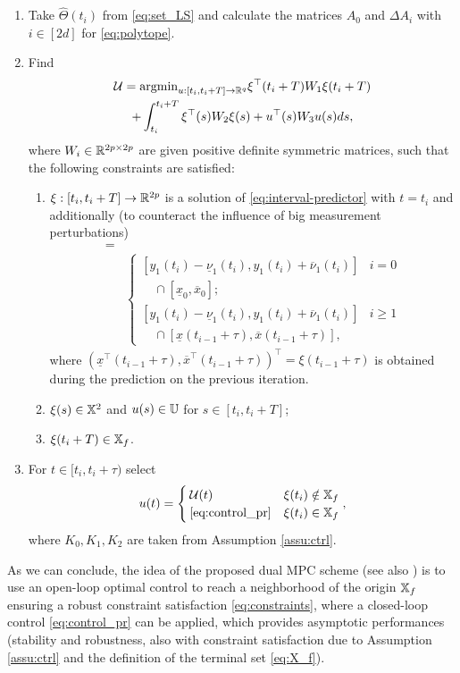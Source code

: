 \begin{enumerate}
	\item Take $\hat{\Theta}(t_{i})$ from \eqref{eq:set_LS} and calculate
	the matrices $A_{0}$ and $\Delta A_{i}$ with $i\in[2d]$ for \eqref{eq:polytope}.
	\item Find
	\begin{gather}
	\mathcal{U}=\text{argmin}_{u:[t_{i},t_{i}+T]\to\mathbb{R}^{q}}\xi^{\top}(t_{i}+T)W_{1}\xi(t_{i}+T)\label{eq:OCP}\\
	+\int_{t_{i}}^{t_{i}+T}\xi^{\top}(s)W_{2}\xi(s)+u^{\top}(s)W_{3}u(s)ds,\nonumber 
	\end{gather}
	where $W_{i}\in\mathbb{R}^{2p\times2p}$ are given positive definite symmetric
	matrices, such that the following constraints are satisfied: 
	\begin{enumerate}
		\item $\xi:[t_{i},t_{i}+T]\to\mathbb{R}^{2p}$ is a solution of \eqref{eq:interval-predictor}
		with $t=t_{i}$ and additionally (to counteract the influence of big
		measurement perturbations)
		\begin{align}
		[\underline{x}&(t_{i}),\overline{x}(t_{i})]=\label{eq:update}\\
		&\begin{cases}
		[y_{1}(t_{i})-\underline{\nu}_{1}(t_{i}),y_{1}(t_{i})+\overline{\nu}_{1}(t_{i})] & i=0\\
		\quad\cap[\underline{x}_{0},\overline{x}_{0}];\\{}
		[y_{1}(t_{i})-\underline{\nu}_{1}(t_{i}),y_{1}(t_{i})+\overline{\nu}_{1}(t_{i})] & i\geq1\\
		\quad\cap[\underline{x}(t_{i-1}+\tau),\overline{x}(t_{i-1}+\tau)],
		\end{cases}\nonumber
		\end{align}
		where $(\underline{x}^{\top}(t_{i-1}+\tau),\overline{x}^{\top}(t_{i-1}+\tau))^{\top}=\xi(t_{i-1}+\tau)$
		is obtained during the prediction on the previous iteration.
		\item $\xi(s)\in\mathbb{X}^{2}$ and $u(s)\in\mathbb{U}$ for $s\in[t_{i},t_{i}+T]$; 
		\item $\xi(t_{i}+T)\in\mathbb{X}_{f}$.
	\end{enumerate}
	\item For $t\in[t_{i},t_{i}+\tau)$ select
	\begin{equation}
	u(t)=\begin{cases}
	\mathcal{U}(t) & \xi(t_{i})\notin\mathbb{X}_{f}\\
	\eqref{eq:control_pr} & \xi(t_{i})\in\mathbb{X}_{f}
	\end{cases},\label{eq:control}
	\end{equation}
	where $K_{0},K_{1},K_{2}$ are taken from Assumption \ref{assu:ctrl}.
\end{enumerate}
As we can conclude, the idea of the proposed dual \gls{MPC} scheme (see
also \citep{Michalska1993,MPC1,MPC:Tube2}) is to use an open-loop
optimal control to reach a neighborhood of the origin $\mathbb{X}_{f}$ ensuring
a robust constraint satisfaction \eqref{eq:constraints}, where a
closed-loop control \eqref{eq:control_pr} can be applied, which provides
asymptotic performances (stability and robustness, also with constraint
satisfaction due to Assumption \ref{assu:ctrl} and the definition
of the terminal set \eqref{eq:X_f}). 

